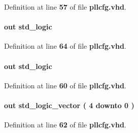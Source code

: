 Definition at line {\bf 57} of file {\bf pllcfg.\+vhd}.

\paragraph[{phcfg\+\_\+tst}]{ {\bfseries \textcolor{keywordflow}{out}\textcolor{vhdlchar}{ }} {\bfseries \textcolor{comment}{std\+\_\+logic}\textcolor{vhdlchar}{ }} \hspace{0.3cm}{\ttfamily [Port]}}\label{classpllcfg_ab5f5d4e9c2405fb83741eedaf2c45f92}


Definition at line {\bf 64} of file {\bf pllcfg.\+vhd}.

\paragraph[{phcfg\+\_\+updn}]{ {\bfseries \textcolor{keywordflow}{out}\textcolor{vhdlchar}{ }} {\bfseries \textcolor{comment}{std\+\_\+logic}\textcolor{vhdlchar}{ }} \hspace{0.3cm}{\ttfamily [Port]}}\label{classpllcfg_a10148149d3d95f09e47cc7f7f11761b5}


Definition at line {\bf 60} of file {\bf pllcfg.\+vhd}.

\paragraph[{pll\+\_\+ind}]{ {\bfseries \textcolor{keywordflow}{out}\textcolor{vhdlchar}{ }} {\bfseries \textcolor{comment}{std\+\_\+logic\+\_\+vector}\textcolor{vhdlchar}{ }\textcolor{vhdlchar}{(}\textcolor{vhdlchar}{ }\textcolor{vhdlchar}{ } \textcolor{vhdldigit}{4} \textcolor{vhdlchar}{ }\textcolor{keywordflow}{downto}\textcolor{vhdlchar}{ }\textcolor{vhdlchar}{ } \textcolor{vhdldigit}{0} \textcolor{vhdlchar}{ }\textcolor{vhdlchar}{)}\textcolor{vhdlchar}{ }} \hspace{0.3cm}{\ttfamily [Port]}}\label{classpllcfg_a23cff2801310c27b1d4bf64354f168ad}


Definition at line {\bf 62} of file {\bf pllcfg.\+vhd}.

